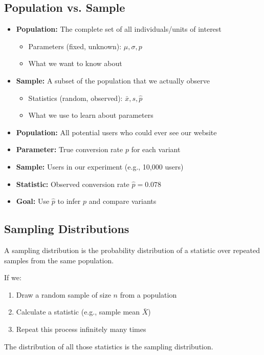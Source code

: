\subsection{Population vs. Sample}

\begin{itemize}
    \item \textbf{Population:} The complete set of all individuals/units of interest
    \begin{itemize}
        \item Parameters (fixed, unknown): $\mu, \sigma, p$
        \item What we want to know about
    \end{itemize}

    \item \textbf{Sample:} A subset of the population that we actually observe
    \begin{itemize}
        \item Statistics (random, observed): $\bar{x}, s, \hat{p}$
        \item What we use to learn about parameters
    \end{itemize}
\end{itemize}

\begin{example}
\begin{itemize}
    \item \textbf{Population:} All potential users who could ever see our website
    \item \textbf{Parameter:} True conversion rate $p$ for each variant
    \item \textbf{Sample:} Users in our experiment (e.g., 10,000 users)
    \item \textbf{Statistic:} Observed conversion rate $\hat{p} = 0.078$
    \item \textbf{Goal:} Use $\hat{p}$ to infer $p$ and compare variants
\end{itemize}
\end{example}

\subsection{Sampling Distributions}

A sampling distribution is the probability distribution of a statistic over repeated samples from the same population.

\begin{definition}
If we:
\begin{enumerate}
    \item Draw a random sample of size $n$ from a population
    \item Calculate a statistic (e.g., sample mean $\bar{X}$)
    \item Repeat this process infinitely many times
\end{enumerate}

The distribution of all those statistics is the sampling distribution.
\end{definition}

